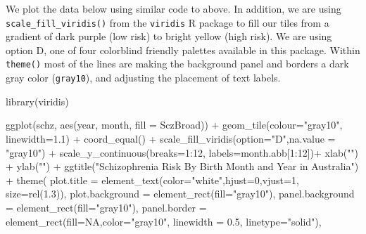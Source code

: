 \documentclass[
  letterpaper,
  DIV=11,
  numbers=noendperiod]{scrreprt}
\newenvironment{Shaded}{\begin{snugshade}}{\end{snugshade}}
\newcommand{\AttributeTok}[1]{\textcolor[rgb]{0.40,0.45,0.13}{#1}}
\newcommand{\ConstantTok}[1]{\textcolor[rgb]{0.56,0.35,0.01}{#1}}
\newcommand{\DecValTok}[1]{\textcolor[rgb]{0.68,0.00,0.00}{#1}}
\newcommand{\FloatTok}[1]{\textcolor[rgb]{0.68,0.00,0.00}{#1}}
\newcommand{\FunctionTok}[1]{\textcolor[rgb]{0.28,0.35,0.67}{#1}}
\newcommand{\NormalTok}[1]{\textcolor[rgb]{0.00,0.23,0.31}{#1}}
\newcommand{\SpecialCharTok}[1]{\textcolor[rgb]{0.37,0.37,0.37}{#1}}
\newcommand{\StringTok}[1]{\textcolor[rgb]{0.13,0.47,0.30}{#1}}
\begin{document}
We plot the data below using similar code to above. In addition, we are
using \texttt{scale\_fill\_viridis()} from the \texttt{viridis} R
package to fill our tiles from a gradient of dark purple (low risk) to
bright yellow (high risk). We are using option D, one of four colorblind
friendly palettes available in this package. Within \texttt{theme()}
most of the lines are making the background panel and borders a dark
gray color (\texttt{gray10}), and adjusting the placement of text
labels.

\begin{Shaded}
\begin{Highlighting}[]
\FunctionTok{library}\NormalTok{(viridis)}

\FunctionTok{ggplot}\NormalTok{(schz, }\FunctionTok{aes}\NormalTok{(year, month, }\AttributeTok{fill =}\NormalTok{ SczBroad)) }\SpecialCharTok{+} 
  \FunctionTok{geom\_tile}\NormalTok{(}\AttributeTok{colour=}\StringTok{"gray10"}\NormalTok{, }\AttributeTok{linewidth=}\FloatTok{1.1}\NormalTok{) }\SpecialCharTok{+} 
  \FunctionTok{coord\_equal}\NormalTok{() }\SpecialCharTok{+}
  \FunctionTok{scale\_fill\_viridis}\NormalTok{(}\AttributeTok{option=}\StringTok{"D"}\NormalTok{,}\AttributeTok{na.value =} \StringTok{"gray10"}\NormalTok{) }\SpecialCharTok{+}
  \FunctionTok{scale\_y\_continuous}\NormalTok{(}\AttributeTok{breaks=}\DecValTok{1}\SpecialCharTok{:}\DecValTok{12}\NormalTok{, }\AttributeTok{labels=}\NormalTok{month.abb[}\DecValTok{1}\SpecialCharTok{:}\DecValTok{12}\NormalTok{])}\SpecialCharTok{+}
  \FunctionTok{xlab}\NormalTok{(}\StringTok{""}\NormalTok{) }\SpecialCharTok{+} 
  \FunctionTok{ylab}\NormalTok{(}\StringTok{""}\NormalTok{) }\SpecialCharTok{+}
  \FunctionTok{ggtitle}\NormalTok{(}\StringTok{"Schizophrenia Risk By Birth Month and Year in Australia"}\NormalTok{) }\SpecialCharTok{+}
  \FunctionTok{theme}\NormalTok{(}
    \AttributeTok{plot.title =} \FunctionTok{element\_text}\NormalTok{(}\AttributeTok{color=}\StringTok{"white"}\NormalTok{,}\AttributeTok{hjust=}\DecValTok{0}\NormalTok{,}\AttributeTok{vjust=}\DecValTok{1}\NormalTok{, }\AttributeTok{size=}\FunctionTok{rel}\NormalTok{(}\FloatTok{1.3}\NormalTok{)),}
    \AttributeTok{plot.background =} \FunctionTok{element\_rect}\NormalTok{(}\AttributeTok{fill=}\StringTok{"gray10"}\NormalTok{),}
    \AttributeTok{panel.background =} \FunctionTok{element\_rect}\NormalTok{(}\AttributeTok{fill=}\StringTok{"gray10"}\NormalTok{),}
    \AttributeTok{panel.border =} \FunctionTok{element\_rect}\NormalTok{(}\AttributeTok{fill=}\ConstantTok{NA}\NormalTok{,}\AttributeTok{color=}\StringTok{"gray10"}\NormalTok{, }\AttributeTok{linewidth =} \FloatTok{0.5}\NormalTok{, }\AttributeTok{linetype=}\StringTok{"solid"}\NormalTok{),}

\end{Highlighting}
\end{Shaded}
\end{document}
